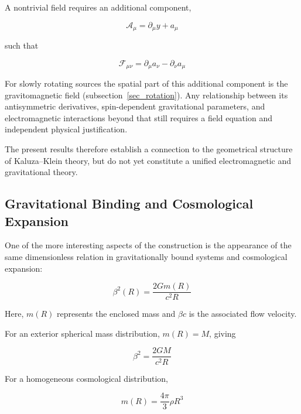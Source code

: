 \documentclass[pdflatex,sn-mathphys-num]{sn-jnl}%
\theoremstyle{thmstyleone}%
\theoremstyle{thmstyletwo}%
\theoremstyle{thmstylethree}%
\begin{document}
A nontrivial field requires an additional component,

\begin{equation}
    \mathcal{A}_{\mu}
    =
    \partial_{\mu}y+a_{\mu}
\end{equation}

such that

\begin{equation}
    \mathcal{F}_{\mu\nu}
    =
    \partial_{\mu}a_{\nu}
    -
    \partial_{\nu}a_{\mu}
\end{equation}

For slowly rotating sources the spatial part of this additional component is the gravitomagnetic field (subsection~\ref{sec_rotation}). Any relationship between its antisymmetric derivatives, spin-dependent gravitational parameters, and electromagnetic interactions beyond that still requires a field equation and independent physical justification.

The present results therefore establish a connection to the geometrical structure of Kaluza--Klein theory, but do not yet constitute a unified electromagnetic and gravitational theory.

\subsection{Gravitational Binding and Cosmological Expansion}

One of the more interesting aspects of the construction is the appearance of the same dimensionless relation in gravitationally bound systems and cosmological expansion:

\begin{equation}
    \boxed{
        \beta^2(R)
        =
        \frac{2Gm(R)}{c^2R}
    }
\end{equation}

Here, $m(R)$ represents the enclosed mass and $\beta c$ is the associated flow velocity.

For an exterior spherical mass distribution, $m(R)=M$, giving

\begin{equation}
    \beta^2
    =
    \frac{2GM}{c^2R}
\end{equation}

For a homogeneous cosmological distribution,

\begin{equation}
    m(R)
    =
    \frac{4\pi}{3}\rho R^3
\end{equation}
\end{document}
